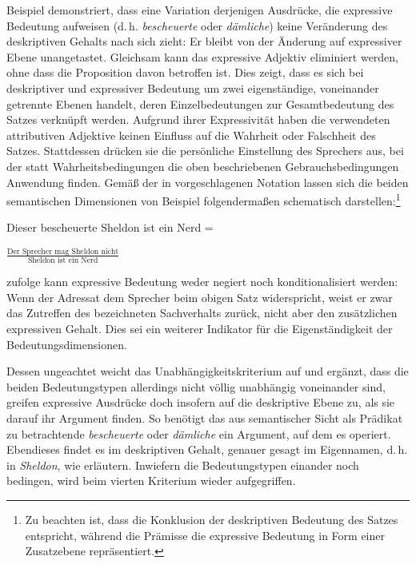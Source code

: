 Beispiel  demonstriert, dass eine Variation derjenigen Ausdrücke, die expressive Bedeutung aufweisen (d.\,h. \textit{bescheuerte} oder \textit{dämliche}) keine Veränderung des deskriptiven Gehalts nach sich zieht: Er bleibt von der Änderung auf expressiver Ebene unangetastet. Gleichsam kann das expressive Adjektiv eliminiert werden, ohne dass die Proposition davon betroffen ist. Dies zeigt, dass es sich bei deskriptiver und expressiver Bedeutung um zwei eigenständige, voneinander getrennte Ebenen handelt, deren Einzelbedeutungen zur Gesamtbedeutung des Satzes verknüpft werden. Aufgrund ihrer Expressivität haben die verwendeten attributiven Adjektive keinen Einfluss auf die Wahrheit oder Falschheit des Satzes. Stattdessen drücken sie die persönliche Einstellung des Sprechers aus, bei der statt Wahrheitsbedingungen die oben beschriebenen Gebrauchsbedingungen Anwendung finden. Gemäß der in {\citet[5]{Gutzmann.2013a}} vorgeschlagenen Notation lassen sich die beiden semantischen Dimensionen von Beispiel  folgendermaßen schematisch darstellen:\footnote{Zu beachten ist, dass die Konklusion der deskriptiven Bedeutung des Satzes entspricht, während die Prämisse die expressive Bedeutung in Form einer Zusatzebene repräsentiert.} \medskip

Dieser bescheuerte Sheldon ist ein Nerd = \begin{large} $\frac{\text{Der Sprecher mag Sheldon nicht}}{\text{Sheldon ist ein Nerd}}$ \end{large} \medskip

\citet[8]{Kaplan.1997} zufolge kann expressive Bedeutung weder negiert noch konditionalisiert werden: Wenn der Adressat dem Sprecher beim obigen Satz widerspricht, weist er zwar das Zutreffen des bezeichneten Sachverhalts zurück, nicht aber den zusätzlichen expressiven Gehalt. Dies sei ein weiterer Indikator für die Eigenständigkeit der Bedeutungsdimensionen.

Dessen ungeachtet weicht \citet[168]{Potts.2007a} das Unabhängigkeitskriterium auf und ergänzt, dass die beiden Bedeutungstypen allerdings nicht völlig unabhängig voneinander sind, greifen expressive Ausdrücke doch insofern auf die deskriptive Ebene zu, als sie darauf ihr Argument finden. So benötigt das aus semantischer Sicht als Prädikat zu betrachtende \textit{bescheuerte} oder \textit{dämliche} ein Argument, auf dem es operiert. Ebendieses findet es im deskriptiven Gehalt, genauer gesagt im Eigennamen, d.\,h. in \textit{Sheldon}, wie \citet[9]{dAvis.2019b} erläutern. Inwiefern die Bedeutungstypen einander noch bedingen, wird beim vierten Kriterium wieder aufgegriffen.

